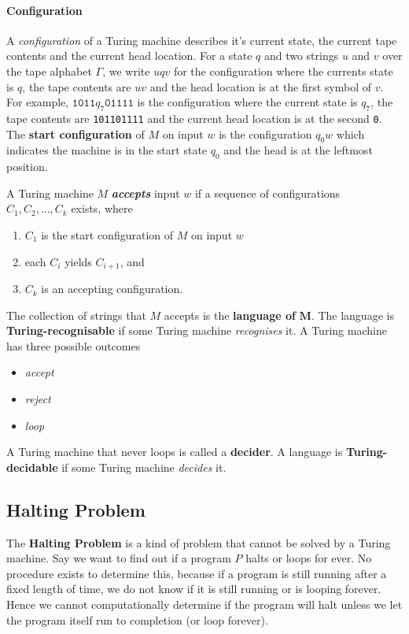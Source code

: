 \paragraph{Configuration} A \emph{configuration} of a Turing machine describes it's current state, the current tape contents and the current head location. For a state \( q \) and two strings \( u\) and \( v \) over the tape alphabet \( \Gamma \), we write \( uqv \) for the configuration where the currents state is \( q \), the tape contents are \( uv \) and the head location is at the first symbol of \( v \). For example, \( \texttt{1011}q_7\texttt{01111} \) is the configuration where the current state is \( q_7 \), the tape contents are \texttt{101101111} and the current head location is at the second \texttt{0}. The \textbf{start configuration} of \( M \) on input \( w \) is the configuration \( q_0w \) which indicates the machine is in the start state \( q_0 \) and the head is at the leftmost position.

A Turing machine \( M \) \textbf{\emph{accepts} } input \( w \) if a sequence of configurations \( C_1, C_2, \ldots, C_k \) exists, where

\begin{enumerate}
	\item \( C_1 \) is the start configuration of \( M \) on input \( w \)
	\item each \( C_i \) yields \( C_{i+1} \), and
	\item \( C_k \) is an accepting configuration.
\end{enumerate}

The collection of strings that \( M \) accepts is the \textbf{language of} \( \mathbf{M} \). The language is \textbf{Turing-recognisable} if some Turing machine \emph{recognises} it. A Turing machine has three possible outcomes
	\begin{itemize}
		\item \emph{accept} 
		\item \emph{reject} 
		\item \emph{loop} 
	\end{itemize}
A Turing machine that never loops is called a \textbf{decider}. A language is \textbf{Turing-decidable} if some Turing machine \emph{decides} it.

\subsection{Halting Problem}
The \textbf{Halting Problem} is a kind of problem that cannot be solved by a Turing machine. Say we want to find out if a program \( P \) halts or loops for ever. No procedure exists to determine this, because if a program is still running after a fixed length of time, we do not know if it is still running or is looping forever. Hence we cannot computationally determine if the program will halt unless we let the program itself run to completion (or loop forever).
